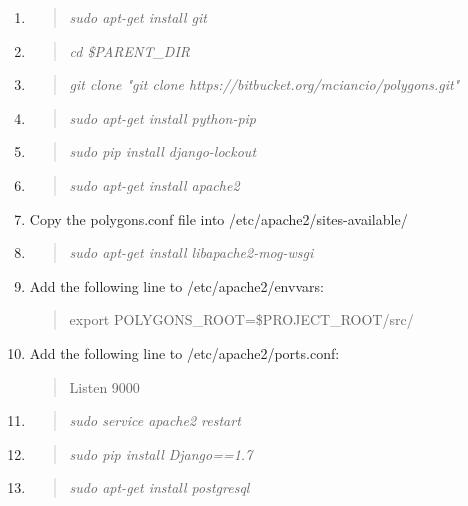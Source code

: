 \documentclass[12pt]{article}
\newenvironment{command}
   { 
      \begin{quote}\itshape
      \color{blue}
   }
   { \end{quote} }
\newenvironment{data}
   { 
      \begin{quote}\itshape
      \color{red}
   }
   { \end{quote} }
\begin{document}
\begin{enumerate}
   \item \begin{command} sudo apt-get install git \end{command}
   \item \begin{command} cd \$PARENT\_DIR \end{command}
   \item \begin{command} git clone "git clone
         https://bitbucket.org/mciancio/polygons.git" \end{command}
   \item \begin{command} sudo apt-get install python-pip \end{command}
   \item \begin{command} sudo pip install django-lockout \end{command}
   \item \begin{command} sudo apt-get install apache2 \end{command}
   \item Copy the polygons.conf file into /etc/apache2/sites-available/
   \item \begin{command} sudo apt-get install libapache2-mog-wsgi \end{command}
   \item Add the following line to /etc/apache2/envvars:
         \begin{data}
         export POLYGONS\_ROOT=\$PROJECT\_ROOT/src/
         \end{data}
   \item Add the following line to /etc/apache2/ports.conf:
         \begin{data}
         Listen 9000
         \end{data}
   \item \begin{command} sudo service apache2 restart \end{command}
   \item \begin{command} sudo pip install Django==1.7 \end{command}
   \item \begin{command} sudo apt-get install postgresql \end{command}

\end{enumerate}
\end{document}
